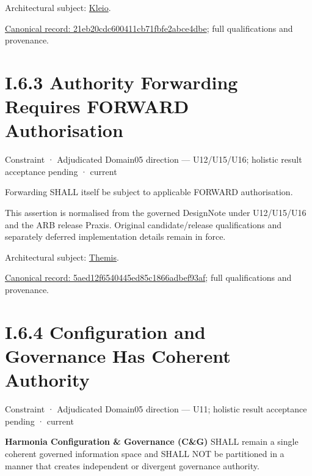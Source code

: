 Architectural subject: \hyperref[element:fefda110e2274884ad58906733606efd]{Kleio}.


{\footnotesize \href{../../../../continuum/motivation/constraint/21eb20cdc600411cb71fbfe2abce4dbe.md}{Canonical record: 21eb20cdc600411cb71fbfe2abce4dbe}; full qualifications and provenance.}\par
\section*{I.6.3 Authority Forwarding Requires FORWARD Authorisation}
\label{navigation:I.6.3}

\label{element:5aed12f6540445ed85c1866adbef93af}
{\small Constraint · Adjudicated Domain05 direction — U12/U15/U16; holistic result acceptance pending · current}\par

Forwarding SHALL itself be subject to applicable FORWARD authorisation.



This assertion is normalised from the governed DesignNote under U12/U15/U16 and the ARB release Praxis. Original candidate/release qualifications and separately deferred implementation details remain in force.



Architectural subject: \hyperref[element:899d34ec491948b68aad09e507dea6d1]{Themis}.


{\footnotesize \href{../../../../continuum/motivation/constraint/5aed12f6540445ed85c1866adbef93af.md}{Canonical record: 5aed12f6540445ed85c1866adbef93af}; full qualifications and provenance.}\par
\section*{I.6.4 Configuration and Governance Has Coherent Authority}
\label{navigation:I.6.4}

\label{element:7cdbc752ca2e4ebf9ee5acff84fd7400}
{\small Constraint · Adjudicated Domain05 direction — U11; holistic result acceptance pending · current}\par

\textbf{Harmonia Configuration \& Governance (C\&G)} SHALL remain a single coherent governed information space and SHALL NOT be partitioned in a manner that creates independent or divergent governance authority.



